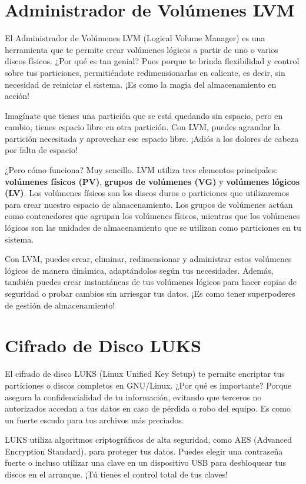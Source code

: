 \documentclass[
  jou,
  floatsintext,
  longtable,
  a4paper,
  nolmodern,
  notxfonts,
  notimes,
  12pt,
  colorlinks=true,linkcolor=blue,citecolor=blue,urlcolor=blue]{apa7}
\begin{document}
\section{Administrador de Volúmenes
LVM}\label{administrador-de-voluxfamenes-lvm}

El Administrador de Volúmenes LVM (Logical Volume Manager) es una
herramienta que te permite crear volúmenes lógicos a partir de uno o
varios discos físicos. ¿Por qué es tan genial? Pues porque te brinda
flexibilidad y control sobre tus particiones, permitiéndote
redimensionarlas en caliente, es decir, sin necesidad de reiniciar el
sistema. ¡Es como la magia del almacenamiento en acción!

Imagínate que tienes una partición que se está quedando sin espacio,
pero en cambio, tienes espacio libre en otra partición. Con LVM, puedes
agrandar la partición necesitada y aprovechar ese espacio libre. ¡Adiós
a los dolores de cabeza por falta de espacio!

¿Pero cómo funciona? Muy sencillo. LVM utiliza tres elementos
principales: \textbf{volúmenes físicos (PV)}, \textbf{grupos de
volúmenes (VG)} y \textbf{volúmenes lógicos (LV)}. Los volúmenes físicos
son los discos duros o particiones que utilizaremos para crear nuestro
espacio de almacenamiento. Los grupos de volúmenes actúan como
contenedores que agrupan los volúmenes físicos, mientras que los
volúmenes lógicos son las unidades de almacenamiento que se utilizan
como particiones en tu sistema.

Con LVM, puedes crear, eliminar, redimensionar y administrar estos
volúmenes lógicos de manera dinámica, adaptándolos según tus
necesidades. Además, también puedes crear instantáneas de tus volúmenes
lógicos para hacer copias de seguridad o probar cambios sin arriesgar
tus datos. ¡Es como tener superpoderes de gestión de almacenamiento!

\section{Cifrado de Disco LUKS}\label{cifrado-de-disco-luks}

El cifrado de disco LUKS (Linux Unified Key Setup) te permite encriptar
tus particiones o discos completos en GNU/Linux. ¿Por qué es importante?
Porque asegura la confidencialidad de tu información, evitando que
terceros no autorizados accedan a tus datos en caso de pérdida o robo
del equipo. Es como un fuerte escudo para tus archivos más preciados.

LUKS utiliza algoritmos criptográficos de alta seguridad, como AES
(Advanced Encryption Standard), para proteger tus datos. Puedes elegir
una contraseña fuerte o incluso utilizar una clave en un dispositivo USB
para desbloquear tus discos en el arranque. ¡Tú tienes el control total
de tus claves!
\end{document}
